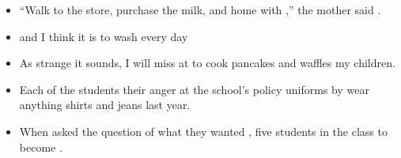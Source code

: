 \begin{itemize}
\item \begin{inparaenum}[A]
``Walk  to the store, purchase the milk, and  home with ,'' the mother said  . 
\end{inparaenum}

\item \begin{inparaenum}[A]
 and  I think it is  to wash  every day 
\end{inparaenum}

\item \begin{inparaenum}[A]
As strange  it sounds, I will miss  at  to cook pancakes and waffles  my children. 
\end{inparaenum}

\item \begin{inparaenum}[A]
Each of the students  their anger at the school's policy  uniforms by  wear anything  shirts and jeans last year. 
\end{inparaenum}

\item \begin{inparaenum}[A]
When asked the question of what  they wanted , five students in the class  to become . 
\end{inparaenum}


\end{itemize}
